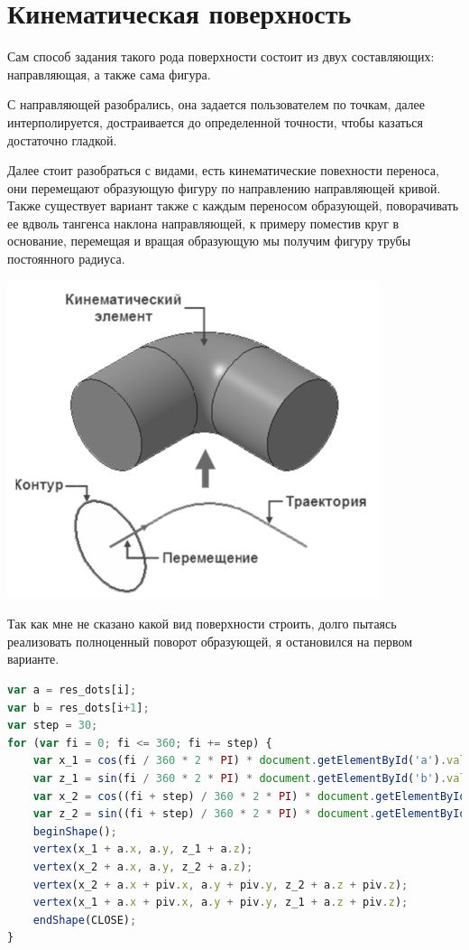 \section{Кинематическая поверхность}

Сам способ задания такого рода поверхности состоит из двух составляющих: направляющая, а также сама фигура.

С направляющей разобрались, она задается пользователем по точкам, далее интерполируется, достраивается до определенной точности, чтобы казаться достаточно гладкой.

Далее стоит разобраться с видами, есть кинематические повехности переноса, они перемещают образующую фигуру по направлению направляющей кривой. Также существует вариант также с каждым переносом образующей, поворачивать ее вдволь тангенса наклона направляющей, к примеру поместив круг в основание, перемещая и вращая образующую мы получим фигуру трубы постоянного радиуса.

\includegraphics[scale=0.5]{pictures/1.jpg}

Так как мне не сказано какой вид поверхности строить, долго пытаясь реализовать полноценный поворот образующей, я остановился на первом варианте.

\begin{lstlisting}[language=Javascript]
var a = res_dots[i];
var b = res_dots[i+1];
var step = 30;
for (var fi = 0; fi <= 360; fi += step) {
    var x_1 = cos(fi / 360 * 2 * PI) * document.getElementById('a').value;
    var z_1 = sin(fi / 360 * 2 * PI) * document.getElementById('b').value;
    var x_2 = cos((fi + step) / 360 * 2 * PI) * document.getElementById('a').value;
    var z_2 = sin((fi + step) / 360 * 2 * PI) * document.getElementById('b').value;
    beginShape();
    vertex(x_1 + a.x, a.y, z_1 + a.z);
    vertex(x_2 + a.x, a.y, z_2 + a.z);
    vertex(x_2 + a.x + piv.x, a.y + piv.y, z_2 + a.z + piv.z);
    vertex(x_1 + a.x + piv.x, a.y + piv.y, z_1 + a.z + piv.z);
    endShape(CLOSE);
}
\end{lstlisting}

